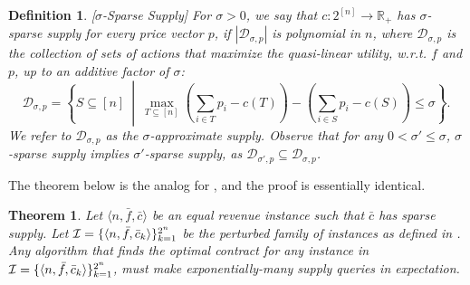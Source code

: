\documentclass[11pt]{article}
\newtheorem{theorem}{Theorem}
\newtheorem{definition}{Definition}
\newcommand{\reals}{\mathbb{R}}
\newcommand{\feq}{\bar{f}}
\newcommand{\ceq}{\bar{c}}
\newcommand{\supply}[2]{\mathcal{D}_{{#1},{#2}}}
\newcommand{\supSigP}{\supply{\sigma}{p}}
\newcommand{\eqRevInst}{\langle n,\feq,\ceq \rangle}
\begin{document}
\begin{definition}\label{def:sparseSupply}[$\sigma$-Sparse Supply]
For $\sigma >0$, we say that $c: 2^{[n]} \rightarrow \reals_+$ has $\sigma$-sparse supply for every price vector $p$, if $|\supSigP|$ is polynomial in $n$, where $\supSigP$ is the collection of sets of actions that maximize the quasi-linear utility, w.r.t. $f$ and $p$, up to an additive factor of $\sigma$:
$$
\supSigP = \left\{ S\subseteq [n] ~\middle|~ \max_{T\subseteq [n]} \left(\sum_{i\in T} p_i - c(T)\right) - \left(\sum_{i\in S} p_i - c(S) \right) \le \sigma \right\}.
$$
We refer to $\supSigP$ as the $\sigma$-approximate supply. 
Observe that for any $0 < \sigma' \le \sigma$, $\sigma$-sparse supply implies $\sigma'$-sparse supply, as $\supply{\sigma'}{p} \subseteq \supSigP$.
\end{definition}

The theorem below is the analog for , and the proof is essentially identical.
\begin{theorem}\label{thm:SupplyHardnessForPerturbed}
    Let $\eqRevInst$ be an equal revenue instance such that $\ceq$ has sparse supply. Let $\familyISupModC$ be the perturbed family of instances as defined in .
    Any algorithm that finds the optimal contract for any instance in $\familyISupModC$, must make  exponentially-many supply queries in expectation.
\end{theorem}
\end{document}
